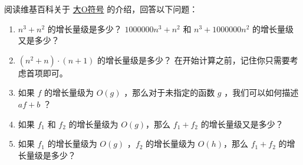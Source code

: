 \begin{exercise}


阅读维基百科关于 \href{http://en.wikipedia.org/wiki/Big_O_notation}{大O符号} 的介绍，回答以下问题：

\begin{enumerate}

\item $n^3 + n^2$ 的增长量级是多少？  $1000000 n^3 + n^2$ 和 $n^3 + 1000000 n^2$ 的增长量级又是多少？


\item $(n^2 + n) \cdot (n + 1)$ 的增长量级是多少？  在开始计算之前，记住你只需要考虑首项即可。


\item 如果 $f$ 的增长量级为 $O(g)$ ，那么对于未指定的函数 $g$ ，我们可以如何描述 $af+b$ ？


\item 如果 $f_1$ 和 $f_2$ 的增长量级为 $O(g)$，那么 $f_1 + f_2$ 的增长量级又是多少？


\item 如果 $f_1$ 的增长量级为 $O(g)$ ，$f_2$ 的增长量级为 $O(h)$，那么 $f_1 + f_2$ 的增长量级是多少？

\end{enumerate}

\end{exercise}

